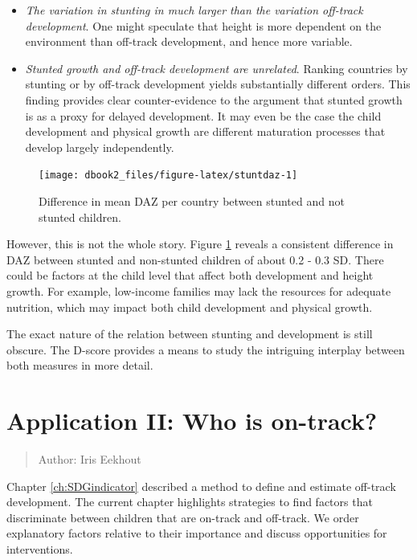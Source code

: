 \documentclass[
]{book}
\providecommand{\tightlist}{%
  \setlength{\itemsep}{0pt}\setlength{\parskip}{0pt}}
\begin{document}
\begin{itemize}
\tightlist
\item
  \emph{The variation in stunting in much larger than the variation off-track development}. One might speculate that height is more dependent on the environment than off-track development, and hence more variable.
\item
  \emph{Stunted growth and off-track development are unrelated}. Ranking countries by stunting or by off-track development yields substantially different orders. This finding provides clear counter-evidence to the argument that stunted growth is as a proxy for delayed development. It may even be the case the child development and physical growth are different maturation processes that develop largely independently.
\end{itemize}

\begin{figure}

{\centering \texttt{[image: dbook2\_files/figure-latex/stuntdaz-1]} 

}

\caption{Difference in mean DAZ per country between stunted and not stunted children.}\label{fig:stuntdaz}
\end{figure}



However, this is not the whole story. Figure \ref{fig:stuntdaz} reveals a consistent difference in DAZ between stunted and non-stunted children of about 0.2 - 0.3 SD. There could be factors at the child level that affect both development and height growth. For example, low-income families may lack the resources for adequate nutrition, which may impact both child development and physical growth.

The exact nature of the relation between stunting and development is still obscure. The D-score provides a means to study the intriguing interplay between both measures in more detail.

\hypertarget{ch:ontrack}{%
\chapter{Application II: Who is on-track?}\label{ch:ontrack}}

\begin{quote}
Author: Iris Eekhout
\end{quote}

Chapter \ref{ch:SDGindicator} described a method to define and estimate off-track development. The current chapter highlights strategies to find factors that discriminate between children that are on-track and off-track. We order explanatory factors relative to their importance and discuss opportunities for interventions.
\end{document}
